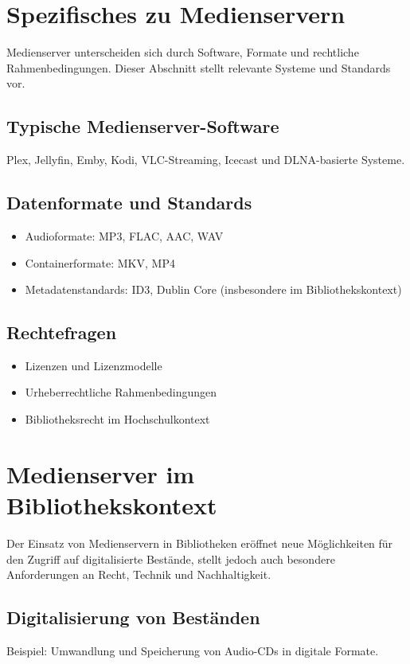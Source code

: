 \documentclass[12pt,a4paper]{report}
\begin{document}
\section{Spezifisches zu Medienservern}
Medienserver unterscheiden sich durch Software, Formate und rechtliche Rahmenbedingungen. Dieser Abschnitt stellt relevante Systeme und Standards vor.

  \subsection{Typische Medienserver-Software}
  Plex, Jellyfin, Emby, Kodi, VLC-Streaming, Icecast und DLNA-basierte Systeme.

  \subsection{Datenformate und Standards}
\begin{itemize}
    \item Audioformate: MP3, FLAC, AAC, WAV
    \item Containerformate: MKV, MP4
    \item Metadatenstandards: ID3, Dublin Core (insbesondere im Bibliothekskontext)
\end{itemize}

  \subsection{Rechtefragen}
    \begin{itemize}
        \item Lizenzen und Lizenzmodelle
        \item Urheberrechtliche Rahmenbedingungen
        \item Bibliotheksrecht im Hochschulkontext
    \end{itemize}

\section{Medienserver im Bibliothekskontext}
Der Einsatz von Medienservern in Bibliotheken eröffnet neue Möglichkeiten für den Zugriff auf digitalisierte Bestände, stellt jedoch auch besondere Anforderungen an Recht, Technik und Nachhaltigkeit.

  \subsection{Digitalisierung von Beständen}
  Beispiel: Umwandlung und Speicherung von Audio-CDs in digitale Formate.
\end{document}
